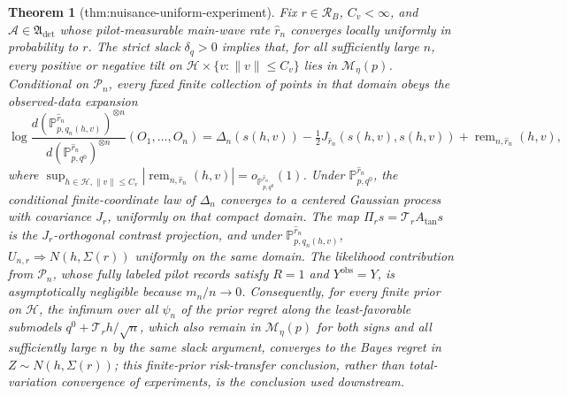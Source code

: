 \documentclass{article}
\newtheorem{theorem}{Theorem}
\begin{document}
\begin{theorem}[thm:nuisance-uniform-experiment]\label{thm:nuisance-uniform-experiment}
Fix \(r\in\mathcal R_B\), \(C_v<\infty\), and \(\mathcal A\in\mathfrak A_{\mathrm{det}}\) whose pilot-measurable main-wave rate \(\widehat r_n\) converges locally uniformly in probability to \(r\). The strict slack \(\delta_q>0\) implies that, for all sufficiently large \(n\), every positive or negative tilt on \(\mathcal H\times\{v:\lVert v\rVert\le C_v\}\) lies in \(\mathcal M_\eta(p)\). Conditional on \(\mathscr P_n\), every fixed finite collection of points in that domain obeys the observed-data expansion \[\log\frac{d(\mathbb P^{\widehat r_n}_{p,q_n(h,v)})^{\otimes n}}{d(\mathbb P^{\widehat r_n}_{p,q^0})^{\otimes n}}(O_1,\ldots,O_n)=\Delta_n(s(h,v))-\tfrac12J_{\widehat r_n}(s(h,v),s(h,v))+\operatorname{rem}_{n,\widehat r_n}(h,v),\] where \(\sup_{h\in\mathcal H,\lVert v\rVert\le C_v}|\operatorname{rem}_{n,\widehat r_n}(h,v)|=o_{\mathbb P^{\widehat r_n}_{p,q^0}}(1)\). Under \(\mathbb P^{\widehat r_n}_{p,q^0}\), the conditional finite-coordinate law of \(\Delta_n\) converges to a centered Gaussian process with covariance \(J_r\), uniformly on that compact domain. The map \(\Pi_rs=\mathcal T_rA_{\mathrm{tan}}s\) is the \(J_r\)-orthogonal contrast projection, and under \(\mathbb P^{\widehat r_n}_{p,q_n(h,v)}\), \(U_{n,r}\Rightarrow N(h,\Sigma(r))\) uniformly on the same domain. The likelihood contribution from \(\mathscr P_n\), whose fully labeled pilot records satisfy \(R=1\) and \(Y^{\mathrm{obs}}=Y\), is asymptotically negligible because \(m_n/n\to0\). Consequently, for every finite prior on \(\mathcal H\), the infimum over all \(\psi_n\) of the prior regret along the least-favorable submodels \(q^0+\mathcal T_rh/\sqrt n\), which also remain in \(\mathcal M_\eta(p)\) for both signs and all sufficiently large \(n\) by the same slack argument, converges to the Bayes regret in \(Z\sim N(h,\Sigma(r))\); this finite-prior risk-transfer conclusion, rather than total-variation convergence of experiments, is the conclusion used downstream.
\end{theorem}
\end{document}
